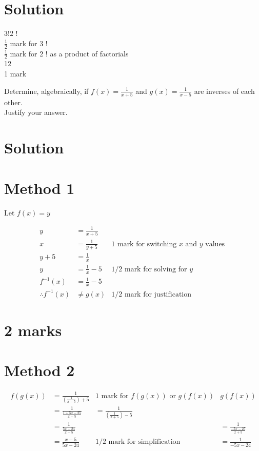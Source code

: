 \documentclass[10pt]{article}
\begin{document}
\section*{Solution}
$3!2$ !\\
$\frac{1}{2}$ mark for 3 !\\
$\frac{1}{2}$ mark for 2 ! as a product of factorials\\
12\\
1 mark

Determine, algebraically, if $f(x)=\frac{1}{x+5}$ and $g(x)=\frac{1}{x-5}$ are inverses of each other.\\
Justify your answer.

\section*{Solution}
\section*{Method 1}
Let $f(x)=y$

$$
\begin{array}{rlrl}
y & =\frac{1}{x+5} & \\
x & =\frac{1}{y+5} & 1 \text { mark for switching } x \text { and } y \text { values } \\
y+5 & =\frac{1}{x} & \\
y & =\frac{1}{x}-5 & 1 / 2 \text { mark for solving for } y \\
f^{-1}(x) & =\frac{1}{x}-5 & \\
\therefore f^{-1}(x) & \neq g(x) & 1 / 2 \text { mark for justification }
\end{array}
$$

\section*{2 marks}
\section*{Method 2}
$$
\begin{array}{rlrl}
f(g(x)) & =\frac{1}{\left(\frac{1}{x-5}\right)+5} & 1 \text { mark for } f(g(x)) \text { or } g(f(x)) & g(f(x)) \\
& =\frac{1}{\frac{1+5 x-25}{x-5}} & =\frac{1}{\left(\frac{1}{x+5}\right)-5} \\
& =\frac{1}{\frac{5 x-24}{x-5}} & & =\frac{1}{\frac{-5 x-25}{x+5}} \\
& =\frac{x-5}{5 x-24} & 1 / 2 \text { mark for simplification } & =\frac{1}{-5 x-24}
\end{array}
$$
\end{document}
